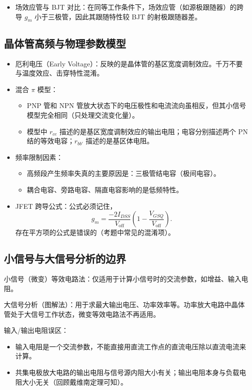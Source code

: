 \documentclass[UTF8,fontset=fandol,zihao=5]{ctexart}
\begin{document}
{\begin{itemize}
  \item 场效应管与 BJT 对比：在同等工作条件下，场效应管（如源极跟随器）的跨导 $g_m$ 小于三极管，因此其跟随特性较 BJT 的射极跟随器差。
\end{itemize}

\subsection{晶体管高频与物理参数模型}

\begin{itemize}
  \item 厄利电压（Early Voltage）：反映的是晶体管的基区宽度调制效应。千万不要与温度效应、击穿特性混淆。

  \item 混合 $\pi$ 模型：
  \begin{itemize}
    \item PNP 管和 NPN 管放大状态下的电压极性和电流流向虽相反，但其小信号模型完全相同（只处理交流变化量）。
    \item 模型中 $r_{ce}$ 描述的是基区宽度调制效应的输出电阻；电容分别描述两个 PN 结的等效电容；$r_{bb'}$ 描述的是基区体电阻。
  \end{itemize}

  \item 频率限制因素：
  \begin{itemize}
    \item 高频段产生频率失真的主要原因是：三极管结电容（极间电容）。
    \item 耦合电容、旁路电容、隔直电容影响的是低频特性。
  \end{itemize}

  \item JFET 跨导公式：公式必须记住，
  \[
    g_m=\frac{-2I_{DSS}}{V_{\mathrm{off}}}
    \left(1-\frac{V_{GSQ}}{V_{\mathrm{off}}}\right).
  \]
  存在平方项的公式是错误的（考题中常见的混淆项）。
\end{itemize}

\subsection{小信号与大信号分析的边界}

小信号（微变）等效电路法：仅适用于计算小信号时的交流参数，如增益、输入电阻。

大信号分析（图解法）：用于求最大输出电压、功率效率等。功率放大电路中晶体管处于大信号工作状态，微变等效电路法不再适用。

输入/输出电阻误区：
\begin{itemize}
  \item 输入电阻是一个交流参数，不能直接用直流工作点的直流电压除以直流电流来计算。
  \item 共集电极放大电路的输出电阻与信号源内阻大小有关；输出电阻本身与负载电阻大小无关（回顾戴维南定理可知）。
\end{itemize}

}
\end{document}
